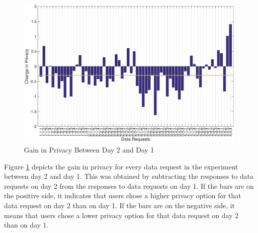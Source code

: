 %
%

\begin{figure}[ht!]
\centering
\includegraphics[width=\textwidth]{./images/day2_day1}
\caption{Gain in Privacy Between Day 2 and Day 1}
\label{fig:day2_day1}
\end{figure}

Figure \ref{fig:day2_day1} depicts the gain in privacy for every data request in the experiment between day 2 and day 1. This was obtained by subtracting the responses to data requests on day 2 from the responses to data requests on day 1. If the bars are on the positive side, it indicates that users chose a higher privacy option for that data request on day 2 than on day 1. If the bars are on the negative side, it means that users chose a lower privacy option for that data request on day 2 than on day 1.

